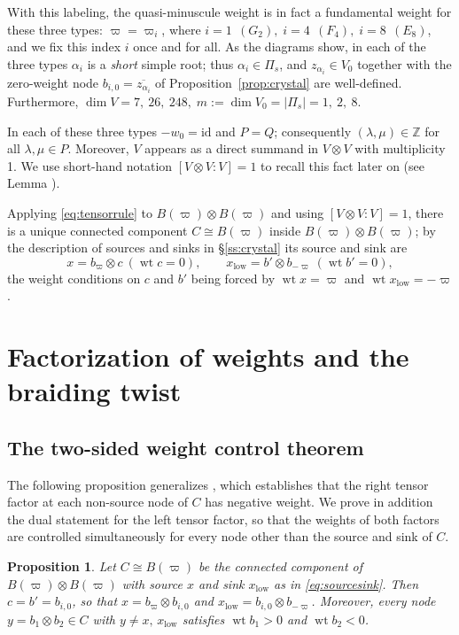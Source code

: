 \documentclass[12pt]{amsart}
\theoremstyle{plain}
\newtheorem{proposition}[theorem]{Proposition}
\theoremstyle{remark}
\newcommand{\wt}{\operatorname{wt}}
\newcommand{\ot}{\otimes}
\newcommand{\vp}{\varpi}
\newcommand{\Pis}{\Pi_{s}}
\begin{document}
With this labeling, the quasi-minuscule weight is in fact a fundamental weight for these three types: $\vp=\vp_i$, where
$i=1\ \ (G_2),\;i=4\ \ (F_4),\;i=8\ \ (E_8)$, and we fix this index $i$ once and for all. As the diagrams show, in each of the three
types $\alpha_i$ is a \emph{short} simple root; thus $\alpha_i\in\Pis$, and
$z_{\alpha_i}\in V_0$ together with the zero-weight node
$b_{i,0}=\overline{z_{\alpha_i}}$ of Proposition~\ref{prop:crystal} are well-defined.
Furthermore, $\dim V=7,\ 26,\ 248,\; m:=\dim V_0=|\Pis|=1,\ 2,\ 8$.

In each of these three types $-w_0=\mathrm{id}$ and $P=Q$; consequently
$(\lambda,\mu)\in\mathbb Z$ for all $\lambda,\mu\in P$. Moreover, $V$ appears as a direct summand in $V\ot V$ with multiplicity 1. We use short-hand notation $[V\ot V:V]=1$ to recall this fact later on (see Lemma \cite[5A.9b]{Jantzen}).

Applying \eqref{eq:tensorrule} to $B(\vp)\ot B(\vp)$ and using $[V\ot V:V]=1$, there is
a unique connected component $C\cong B(\vp)$ inside $B(\vp)\ot B(\vp)$; by the description of sources and sinks in
\S\ref{ss:crystal} its source and sink are
\begin{equation}\label{eq:sourcesink}
x=b_\vp\ot c\ (\wt c=0),\qquad x_{\mathrm{low}}=b'\ot b_{-\vp}\ (\wt b'=0),
\end{equation}
the weight conditions on $c$ and $b'$ being forced by $\wt x=\vp$ and
$\wt x_{\mathrm{low}}=-\vp$.

\section{Factorization of weights and the braiding twist}\label{sec:main}

\subsection{The two-sided weight control theorem}\label{ss:twosided}

The following proposition generalizes \cite[Lemma~3.1]{Dey}, which establishes that the
right tensor factor at each non-source node of $C$ has negative weight. We prove in
addition the dual statement for the left tensor factor, so that the weights of both
factors are controlled simultaneously for every node other than the source and sink
of $C$.

\begin{proposition}\label{prop:twosided}
Let $C\cong B(\vp)$ be the connected component of $B(\vp)\ot B(\vp)$ with source $x$
and sink $x_{\mathrm{low}}$ as in \eqref{eq:sourcesink}. Then $c=b'=b_{i,0}$, so that
$x=b_\vp\ot b_{i,0}$ and $x_{\mathrm{low}}=b_{i,0}\ot b_{-\vp}$. Moreover, every node
$y=b_1\ot b_2\in C$ with $y\neq x,\,x_{\mathrm{low}}$ satisfies $\wt b_1>0$ and $\wt b_2<0$.
\end{proposition}
\end{document}

